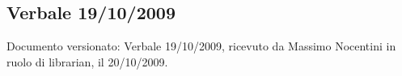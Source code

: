 \subsection{Verbale 19/10/2009}
Documento versionato: Verbale 19/10/2009, ricevuto da Massimo Nocentini in ruolo di librarian, il 20/10/2009. 
